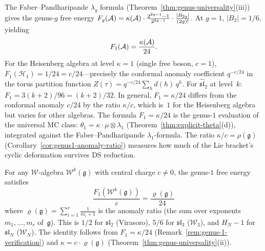 \begin{remark}\label{rem:genus-1-verification}
The Faber--Pandharipande $\lambda_g$ formula (Theorem~\ref{thm:genus-universality}(iii))
gives the genus-$g$ free energy
$F_g(\mathcal{A}) = \kappa(\mathcal{A}) \cdot \frac{2^{2g-1}-1}{2^{2g-1}} \cdot \frac{|B_{2g}|}{(2g)!}$.
At $g = 1$, $|B_2| = 1/6$, yielding
\[
F_1(\mathcal{A}) = \frac{\kappa(\mathcal{A})}{24}.
\]
For the Heisenberg algebra at level $\kappa = 1$ (single free boson, $c = 1$),
$F_1(\mathcal{H}_1) = 1/24 = c/24$---precisely the conformal anomaly coefficient
$q^{-c/24}$ in the torus partition function $Z(\tau) = q^{-c/24}\sum_h d(h)\,q^h$.
For $\widehat{\mathfrak{sl}}_2$ at level~$k$:
$F_1 = 3(k{+}2)/96 = (k{+}2)/32$.
In general, $F_1 = \kappa/24$ differs from the conformal anomaly $c/24$ by the ratio $\kappa/c$, which is~$1$ for the Heisenberg algebra but varies for other algebras.
The formula $F_1 = \kappa/24$ is the genus-$1$ evaluation
of the universal MC class: $\theta_1 = \kappa \cdot \mu
\otimes \lambda_1$
(Theorem~\ref{thm:explicit-theta}(d)), integrated
against the Faber--Pandharipande $\lambda_1$-formula.
The ratio $\kappa/c = \rho(\mathfrak{g})$
(Corollary~\ref{cor:genus1-anomaly-ratio}) measures
how much of the Lie bracket's cyclic deformation
survives DS reduction.
\end{remark}

\begin{corollary}
\label{cor:genus1-anomaly-ratio}
For any $\mathcal{W}$-algebra $\mathcal{W}^k(\mathfrak{g})$ with central charge $c \neq 0$, the genus-$1$ free energy satisfies
\begin{equation}\label{eq:F1-over-c}
\frac{F_1(\mathcal{W}^k(\mathfrak{g}))}{c} = \frac{\varrho(\mathfrak{g})}{24}
\end{equation}
where $\varrho(\mathfrak{g}) = \sum_{i=1}^r \frac{1}{m_i+1}$ is the anomaly ratio (the sum over exponents $m_1, \ldots, m_r$ of~$\mathfrak{g}$).  This is $1/2$ for $\mathfrak{sl}_2$ (Virasoro), $5/6$ for $\mathfrak{sl}_3$ ($\mathcal{W}_3$), and $H_N - 1$ for $\mathfrak{sl}_N$ ($\mathcal{W}_N$).  The identity follows from $F_1 = \kappa/24$ (Remark~\ref{rem:genus-1-verification}) and $\kappa = c \cdot \varrho(\mathfrak{g})$ (Theorem~\ref{thm:genus-universality}\textup{(ii)}).
\end{corollary}

